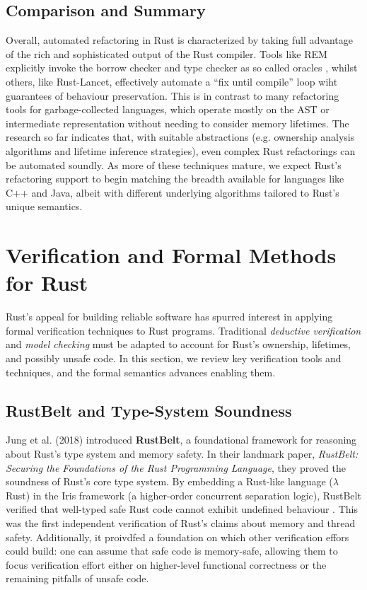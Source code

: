 \subsection{Comparison and Summary}
Overall, automated refactoring in Rust is characterized by taking full advantage
of the rich and sophisticated output of the Rust compiler. Tools like REM
explicitly invoke the borrow checker and type checker as so called oracles
\cite{AdventureOfALifetime}, whilst others, like Rust-Lancet, effectively
automate a ``fix until compile'' loop wiht guarantees of behaviour preservation.
This is in contrast to many refactoring tools for garbage-collected languages,
which operate mostly on the AST or intermediate representation without needing
to consider memory lifetimes. The research so far indicates that, with suitable
abstractions (e.g. ownership analysis algorithms and lifetime inference
strategies), even complex Rust refactorings can be automated soundly. As more of
these techniques mature, we expect Rust's refactoring support to begin matching
the breadth available for languages like C++ and Java, albeit with different
underlying algorithms tailored to Rust's unique semantics.

\section{Verification and Formal Methods for Rust}
\label{sec:verification_formal_methods}
Rust's appeal for building reliable software has spurred interest in applying
formal verification techniques to Rust programs. Traditional \textit{deductive
verification} and \textit{model checking} must be adapted to account for Rust's ownership,
lifetimes, and possibly unsafe code. In this section, we review key verification
tools and techniques, and the formal semantics advances enabling them.

\subsection{RustBelt and Type-System Soundness}

Jung et al. (2018) introduced \textbf{RustBelt}, a foundational framework for
reasoning about Rust's type system and memory safety. In their landmark paper,
\textit{RustBelt: Securing the Foundations of the Rust Programming Language},
they proved the soundness of Rust's core type system. By embedding a Rust-like
language ($\lambda$Rust) in the Iris framework (a higher-order concurrent
separation logic), RustBelt verified that well-typed safe Rust code cannot
exhibit undefined behaviour \cite{RustBelt}. This was the first independent verification of
Rust's claims about memory and thread safety. Additionally, it proivdfed a
foundation on which other verification effors could build: one can assume that
safe code is memory-safe, allowing them to focus verification effort either on
higher-level functional correctness or the remaining pitfalls of unsafe code.


